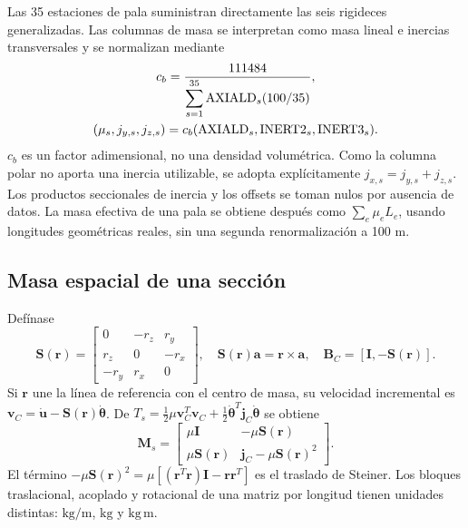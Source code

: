 \documentclass[oneside,a4paper,spanish,links,pagenumbers]{amca}
\newcommand{\I}{\bm I}
\begin{document}
Las 35 estaciones de pala suministran directamente las seis rigideces generalizadas. Las columnas de masa se interpretan como masa lineal e inercias transversales y se normalizan mediante
\begin{equation}
\begin{gathered}
c_b=\frac{111484}{\displaystyle\sum_{s=1}^{35}
{\rm AXIALD}_s(100/35)},\\
(\mu_s,j_{y,s},j_{z,s})=
c_b({\rm AXIALD}_s,{\rm INERT2}_s,{\rm INERT3}_s).
\end{gathered}
\end{equation}
$c_b$ es un factor adimensional, no una densidad volumétrica. Como la columna polar no aporta una inercia utilizable, se adopta explícitamente $j_{x,s}=j_{y,s}+j_{z,s}$. Los productos seccionales de inercia y los offsets se toman nulos por ausencia de datos. La masa efectiva de una pala se obtiene después como $\sum_e\mu_eL_e$, usando longitudes geométricas reales, sin una segunda renormalización a 100 m.

\subsection{Masa espacial de una sección}
Defínase
\begin{equation}
\bm S(\bm r)=
\begin{bmatrix}0&-r_z&r_y\\r_z&0&-r_x\\-r_y&r_x&0\end{bmatrix},
\quad \bm S(\bm r)\bm a=\bm r\times\bm a,
\quad \bm B_C=[\I,-\bm S(\bm r)].
\end{equation}
Si $\bm r$ une la línea de referencia con el centro de masa, su velocidad incremental es $\bm v_C=\dot{\bm u}-\bm S(\bm r)\dot{\bm\theta}$. De
$T_s=\tfrac12\mu\bm v_C^T\bm v_C+\tfrac12\dot{\bm\theta}^T\bm j_C\dot{\bm\theta}$ se obtiene
\begin{equation}
\boxed{\bm M_s=
\begin{bmatrix}
\mu\I&-\mu\bm S(\bm r)\\
\mu\bm S(\bm r)&\bm j_C-\mu\bm S(\bm r)^2
\end{bmatrix}.}
\label{eq:Ms}
\end{equation}
El término $-\mu\bm S(\bm r)^2=\mu[(\bm r^T\bm r)\I-\bm r\bm r^T]$ es el traslado de Steiner. Los bloques traslacional, acoplado y rotacional de una matriz por longitud tienen unidades distintas: $\mathrm{kg/m}$, $\mathrm{kg}$ y $\mathrm{kg\,m}$.
\end{document}
